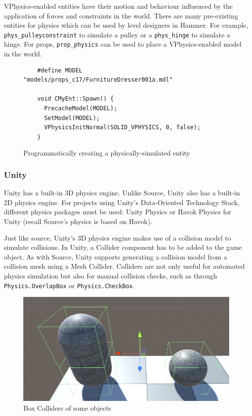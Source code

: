 \documentclass[a4paper, 12pt]{scrartcl}
\begin{document}
VPhysics-enabled entities have their motion and behaviour influenced by the application of forces and constraints in the world. There are many pre-existing entities for physics which can be used by level designers in Hammer. For example, \texttt{phys\_pulleyconstraint} to simulate a pulley or a \texttt{phys\_hinge} to simulate a hinge. For props, \texttt{prop\_physics} can be used to place a VPhysics-enabled model in the world.

\begin{figure}[!ht]
  \begin{verbatim}
    #define MODEL "models/props_c17/FurnitureDresser001a.mdl"

    void CMyEnt::Spawn() {
      PrecacheModel(MODEL);
      SetModel(MODEL);
      VPhysicsInitNormal(SOLID_VPHYSICS, 0, false);
    }
  \end{verbatim}
  \caption{Programmatically creating a physically-simulated entity}
  \label{fig:source_physics_ent}
\end{figure}

\subsubsection{Unity}
Unity has a built-in 3D physics engine. Unlike Source, Unity also has a built-in 2D physics engine. For projects using Unity's Data-Oriented Technology Stack, different physics packages must be used: Unity Physics or Havok Physics for Unity (recall Source's physics is based on Havok).

Just like source, Unity's 3D physics engine makes use of a collision model to simulate collisions. In Unity, a Collider component has to be added to the game object. As with Source, Unity supports generating a collision model from a collision mesh using a Mesh Collider. Colliders are not only useful for automated physics simulation but also for manual collision checks, such as through \texttt{Physics.OverlapBox} or \texttt{Physics.CheckBox}.

\begin{figure}[!ht]
  \centering
  \includegraphics[width=0.66\linewidth]{images/unity_colliders.png}
  \caption{Box Colliders of some objects}
  \label{fig:unity_colliders}
\end{figure}
\end{document}
